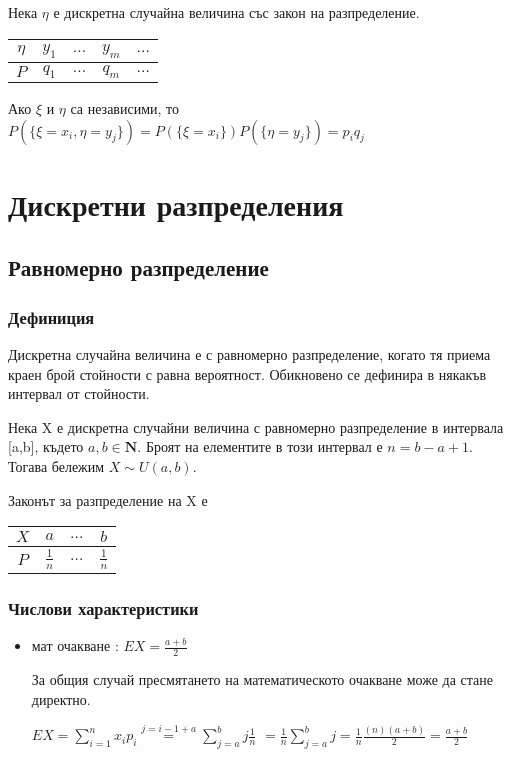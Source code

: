 \documentclass[fleqn,12pt]{article}
\begin{document}
\begin{justify}
Нека $\eta$ е дискретна случайна величина със закон на разпределение.\\
\begin{tabular}{|c|c|c|c|c|}
    \hline
    $\eta$ & $y_1$ & $\dots$ & $y_m$ & $\dots$ \\
    \hline
    $P$ & $q_1$ & $\dots$ & $q_m$ & $\dots$ \\
    \hline
\end{tabular}

Ако $\xi$ и $\eta$ са независими, то $P(\{\xi=x_i,\eta=y_j\}) = P(\{\xi=x_i\}) P(\{\eta=y_j\}) = p_i q_j$

\section{Дискретни разпределения}
\subsection{Равномерно разпределение}
\subsubsection{Дефиниция} 
Дискретна случайна величина е с равномерно разпределение, когато тя приема краен брой стойности с равна вероятност.
Обикновено се дефинира в някакъв интервал от стойности. 

Нека X е дискретна случайни величина с равномерно разпределение в интервала [a,b], където $a,b \in \mathbf{N}$.
 Броят на елементите в този интервал
е $n = b - a + 1$. Тогава бележим $X \sim U(a, b)$.

Законът за разпределение на X е
\begin{tabular}{|c|c|c|c|}
    \hline
    $X$ & $a$ & $\dots$ & $b$ \\
    \hline
    $P$ & $\frac{1}{n}$ & $\dots$ & $\frac{1}{n}$ \\
    \hline
\end{tabular}

\subsubsection{Числови характеристики} 
\begin{itemize}
    \item мат очакване : $EX = \frac{a+b}{2}$
    
    За общия случай пресмятането на математическото очакване може да стане директно.

    $EX = \sum_{i=1}^n x_ip_i \overset{j=i-1+a}{=} \sum_{j=a}^b j \frac{1}{n}$
    $= \frac{1}{n} \sum_{j=a}^b j = \frac{1}{n} \frac{(n)(a+b)}{2} = \frac{a+b}{2}$


\end{itemize}
\end{justify}
\end{document}
